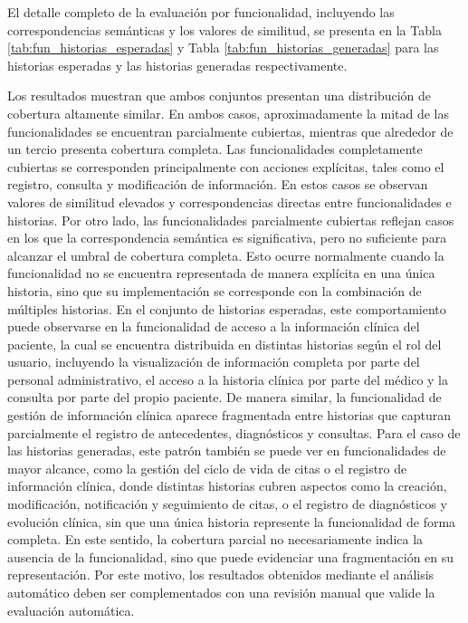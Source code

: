 El detalle completo de la evaluación por funcionalidad, incluyendo las correspondencias semánticas y los valores de similitud, se presenta en la Tabla \ref{tab:fun_historias_esperadas} y Tabla \ref{tab:fun_historias_generadas} para las historias esperadas y las historias generadas respectivamente.

Los resultados muestran que ambos conjuntos presentan una distribución de cobertura altamente similar. En ambos casos, aproximadamente la mitad de las funcionalidades se encuentran parcialmente cubiertas, mientras que alrededor de un tercio presenta cobertura completa.
Las funcionalidades completamente cubiertas se corresponden principalmente con acciones explícitas, tales como el registro, consulta y modificación de información. En estos casos se observan valores de similitud elevados y correspondencias directas entre funcionalidades e historias.
Por otro lado, las funcionalidades parcialmente cubiertas reflejan casos en los que la correspondencia semántica es significativa, pero no suficiente para alcanzar el umbral de cobertura completa. Esto ocurre normalmente cuando la funcionalidad no se encuentra representada de manera explícita en una única historia, sino que su implementación se corresponde con la combinación de múltiples historias. En el conjunto de historias esperadas, este comportamiento puede observarse en la funcionalidad de acceso a la información clínica del paciente, la cual se encuentra distribuida en distintas historias según el rol del usuario, incluyendo la visualización de información completa por parte del personal administrativo, el acceso a la historia clínica por parte del médico y la consulta por parte del propio paciente. De manera similar, la funcionalidad de gestión de información clínica aparece fragmentada entre historias que capturan parcialmente el registro de antecedentes, diagnósticos y consultas. Para el caso de las historias generadas, este patrón también se puede ver en funcionalidades de mayor alcance, como la gestión del ciclo de vida de citas o el registro de información clínica, donde distintas historias cubren aspectos como la creación, modificación, notificación y seguimiento de citas, o el registro de diagnósticos y evolución clínica, sin que una única historia represente la funcionalidad de forma completa.
En este sentido, la cobertura parcial no necesariamente indica la ausencia de la funcionalidad, sino que puede evidenciar una fragmentación en su representación. Por este motivo, los resultados obtenidos mediante el análisis automático deben ser complementados con una revisión manual que valide la evaluación automática.

